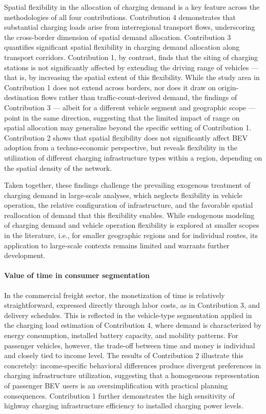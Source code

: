 Spatial flexibility in the allocation of charging demand is a key feature across the methodologies of all four contributions. Contribution 4 demonstrates that substantial charging loads arise from interregional transport flows, underscoring the cross-border dimension of spatial demand allocation. Contribution 3 quantifies significant spatial flexibility in charging demand allocation along transport corridors. Contribution 1, by contrast, finds that the siting of charging stations is not significantly affected by extending the driving range of vehicles — that is, by increasing the spatial extent of this flexibility. While the study area in Contribution 1 does not extend across borders, nor does it draw on origin-destination flows rather than traffic-count-derived demand, the findings of Contribution 3 — albeit for a different vehicle segment and geographic scope — point in the same direction, suggesting that the limited impact of range on spatial allocation may generalize beyond the specific setting of Contribution 1. Contribution 2 shows that spatial flexibility does not significantly affect \ac{BEV} adoption from a techno-economic perspective, but reveals flexibility in the utilization of different charging infrastructure types within a region, depending on the spatial density of the network.

Taken together, these findings challenge the prevailing exogenous treatment of charging demand in large-scale analyses, which neglects flexibility in vehicle operation, the relative configuration of infrastructure, and the favorable spatial reallocation of demand that this flexibility enables. While endogenous modeling of charging demand and vehicle operation flexibility is explored at smaller scopes in the literature, i.e., for smaller geographic regions and for individual routes, its application to large-scale contexts remains limited and warrants further development.




\paragraph*{Value of time in consumer segmentation}
In the commercial freight sector, the monetization of time is relatively straightforward, expressed directly through labor costs, as in Contribution 3, and delivery schedules. This is reflected in the vehicle-type segmentation applied in the charging load estimation of Contribution 4, where demand is characterized by energy consumption, installed battery capacity, and mobility patterns. For passenger vehicles, however, the trade-off between time and money is individual and closely tied to income level. The results of Contribution 2 illustrate this concretely: income-specific behavioral differences produce divergent preferences in charging infrastructure utilization, suggesting that a homogeneous representation of passenger \ac{BEV} users is an oversimplification with practical planning consequences. Contribution 1 further demonstrates the high sensitivity of highway charging infrastructure efficiency to installed charging power levels. 

